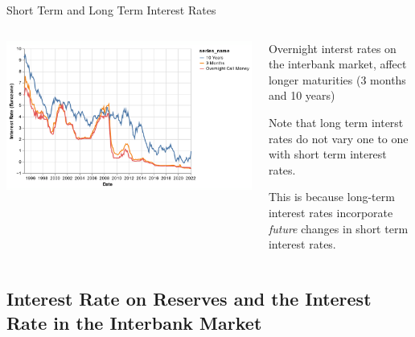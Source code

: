 \documentclass[
  ignorenonframetext,
  aspectratio=169,
]{beamer}
\begin{document}
\begin{frame}{Short Term and Long Term Interest Rates}
\begin{columns}[T]
\begin{column}{0.48\textwidth}
\includegraphics{short_term_long_term.png}
\end{column}

\begin{column}{0.48\textwidth}
Overnight interst rates on the interbank market, affect longer
maturities (3 months and 10 years)

Note that long term interst rates do not vary one to one with short term
interest rates.

This is because long-term interest rates incorporate \emph{future}
changes in short term interest rates.
\end{column}
\end{columns}
\end{frame}

\subsection{Interest Rate on Reserves and the Interest Rate in the
Interbank
Market}\label{interest-rate-on-reserves-and-the-interest-rate-in-the-interbank-market}
\end{document}

